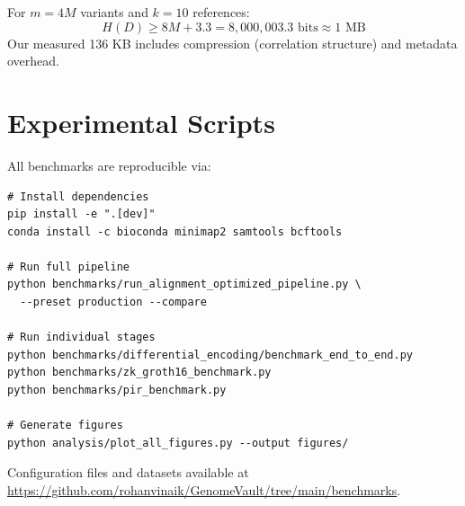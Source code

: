 \documentclass[12pt,a4paper]{article}
\begin{document}
For $m = 4M$ variants and $k = 10$ references:
\[
H(D) \geq 8M + 3.3 = 8,000,003.3 \text{ bits} \approx 1 \text{ MB}
\]
Our measured 136 KB includes compression (correlation structure) and metadata overhead.

\section{Experimental Scripts}

All benchmarks are reproducible via:

\begin{verbatim}
# Install dependencies
pip install -e ".[dev]"
conda install -c bioconda minimap2 samtools bcftools

# Run full pipeline
python benchmarks/run_alignment_optimized_pipeline.py \
  --preset production --compare

# Run individual stages
python benchmarks/differential_encoding/benchmark_end_to_end.py
python benchmarks/zk_groth16_benchmark.py
python benchmarks/pir_benchmark.py

# Generate figures
python analysis/plot_all_figures.py --output figures/
\end{verbatim}

Configuration files and datasets available at \url{https://github.com/rohanvinaik/GenomeVault/tree/main/benchmarks}.
\end{document}
